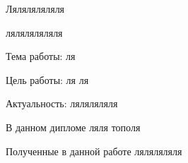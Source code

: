 
Ляляляляляля

ляляляляляля

Тема работы: ля

Цель работы: ля ля

Актуальность: ляляляляля

В данном дипломе ляля тополя

Полученные в данной работе ляляляляля